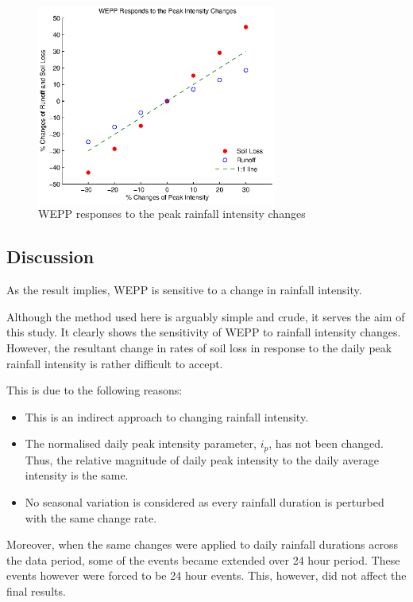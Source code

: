 \begin{figure}[htbp]
  \centering
    \includegraphics[width=0.70\textwidth]
{./img/wepp_respond_to_int_changes}
  \caption{WEPP responses to the peak rainfall intensity changes}
  \label{fig:wepp_respond_to_int_changes}
\end{figure}

\subsection{Discussion}
\label{sec:SensitivityOfWEPPToRainfallIntensityChangesDiscussion}
As the result implies, WEPP is sensitive to a change in rainfall intensity.

Although the method used here is arguably simple and crude, it serves the aim of
this study. It clearly shows the sensitivity of WEPP to rainfall intensity
changes. However, the resultant change in rates of soil loss in response to the
daily peak rainfall intensity is rather difficult to accept.

This is due to the following reasons:
\begin{itemize}
  \item This is an indirect approach to changing rainfall intensity.
  \item The normalised daily peak intensity parameter, $i_p$, has not been
changed. Thus, the relative magnitude of daily peak intensity to the daily
average intensity is the same.
  \item No seasonal variation is considered as every rainfall duration is
perturbed with the same change rate.
\end{itemize}

Moreover, when the same changes were applied to daily rainfall durations across
the data period, some of the events became extended over 24 hour period. These
events however were forced to be 24 hour events. This, however, did not affect
the final results.

